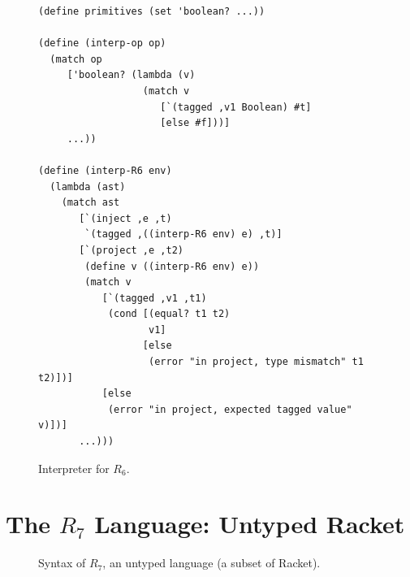 \documentclass[11pt]{book}
\begin{document}
\begin{figure}[tbp]
\begin{lstlisting}
(define primitives (set 'boolean? ...))

(define (interp-op op)
  (match op
     ['boolean? (lambda (v)
                  (match v
                     [`(tagged ,v1 Boolean) #t]
                     [else #f]))]
     ...))

(define (interp-R6 env)
  (lambda (ast)
    (match ast
       [`(inject ,e ,t)
        `(tagged ,((interp-R6 env) e) ,t)]
       [`(project ,e ,t2)
        (define v ((interp-R6 env) e))
        (match v
           [`(tagged ,v1 ,t1)
            (cond [(equal? t1 t2)
                   v1]
                  [else
                   (error "in project, type mismatch" t1 t2)])]
           [else
            (error "in project, expected tagged value" v)])]
       ...)))
\end{lstlisting}
\caption{Interpreter for $R_6$.}
\label{fig:interp-R6}
\end{figure}


\section{The $R_7$ Language: Untyped Racket}
\label{sec:r7-lang}

\begin{figure}[tp]
\centering
{}
\caption{Syntax of $R_7$, an untyped language (a subset of Racket).}
\label{fig:r7-syntax}
\end{figure}
\end{document}
